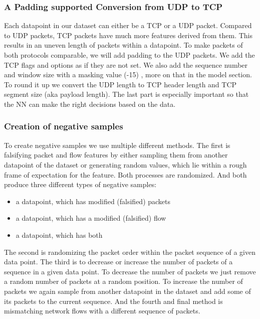 \documentclass[
	ngerman,
	ruledheaders=section,%
	class=report,%
	thesis={type=bachelor},%
	accentcolor=9c,%
	custommargins=true,%
	marginpar=false,%
	parskip=half-,%
	fontsize=11pt,%
]{tudapub}
\begin{document}
\subsubsection{A Padding supported Conversion from UDP to TCP}

Each datapoint in our dataset can either be a TCP or a UDP packet.
Compared to UDP packets, TCP packets have much more features derived from them.
This results in an uneven length of packets within a datapoint.
To make packets of both protocols comparable, we will add padding to the UDP packets.
We add the TCP flags and options as if they are not set.
We also add the sequence number and window size with a masking value (-15) , more on that in the model section.
To round it up we convert the UDP length to TCP header length and TCP segment size (aka payload length).
The last part is especially important so that the NN can make the right decisions based on the data.

\subsubsection{Creation of negative samples}

To create negative samples we use multiple different methods.
The first is falsifying packet and flow features by either sampling them from another datapoint of the dataset or generating random values, which lie within a rough frame of expectation for the feature.
Both processes are randomized.
And both produce three different types of negative samples:

\begin{itemize}
    \item a datapoint, which has modified (falsified) packets
    \item a datapoint, which has a modified (falsified) flow
    \item a datapoint, which has both
\end{itemize}

The second is randomizing the packet order within the packet sequence of a given data point.
The third is to decrease or increase the number of packets of a sequence in a given data point.
To decrease the number of packets we just remove a random number of packets at a random position.
To increase the number of packets we again sample from another datapoint in the dataset and add some of its packets to the current sequence.
And the fourth and final method is mismatching network flows with a different sequence of packets.
\end{document}
